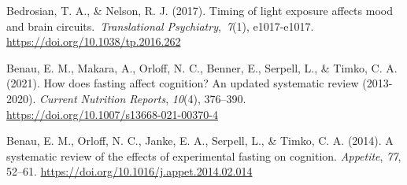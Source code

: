 \documentclass[authordate, empirical]{jote-new-article}
\begin{document}












Bedrosian, T. A., \& Nelson, R. J. (2017). Timing of light exposure affects mood and brain circuits. \emph{Translational Psychiatry}, \emph{7}(1), e1017-e1017. \url{https://doi.org/10.1038/tp.2016.262}






Benau, E. M., Makara, A., Orloff, N. C., Benner, E., Serpell, L., \& Timko, C. A. (2021). How does fasting affect cognition? An updated systematic review (2013-2020). \emph{Current Nutrition Reports}, \emph{10}(4), 376--390. \href{https://doi.org/10.1007/s13668-021-00370-4}{https://doi.org/10.1007/s13668-021-00370-4}



Benau, E. M., Orloff, N. C., Janke, E. A., Serpell, L., \& Timko, C. A. (2014). A systematic review of the effects of experimental fasting on cognition. \emph{Appetite}, \emph{77}, 52--61. \href{https://doi.org/10.1016/j.appet.2014.02.014}{https://doi.org/10.1016/j.appet.2014.02.014}
\end{document}

